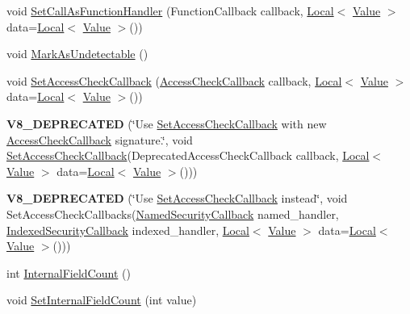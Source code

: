 \begin{DoxyCompactItemize}
\item 
void \hyperlink{classv8_1_1ObjectTemplate_a1775c8f73e643c339804d2f5b628eddf}{Set\+Call\+As\+Function\+Handler} (Function\+Callback callback, \hyperlink{classv8_1_1Local}{Local}$<$ \hyperlink{classv8_1_1Value}{Value} $>$ data=\hyperlink{classv8_1_1Local}{Local}$<$ \hyperlink{classv8_1_1Value}{Value} $>$())
\item 
void \hyperlink{classv8_1_1ObjectTemplate_a7e40ef313b44c2ad336c73051523b4f8}{Mark\+As\+Undetectable} ()
\item 
void \hyperlink{classv8_1_1ObjectTemplate_a5b0337016cd89fc72f3a9d75399c2487}{Set\+Access\+Check\+Callback} (\hyperlink{namespacev8_a1024fb358d107c1494163217830688e6}{Access\+Check\+Callback} callback, \hyperlink{classv8_1_1Local}{Local}$<$ \hyperlink{classv8_1_1Value}{Value} $>$ data=\hyperlink{classv8_1_1Local}{Local}$<$ \hyperlink{classv8_1_1Value}{Value} $>$())
\item 
{\bfseries V8\+\_\+\+D\+E\+P\+R\+E\+C\+A\+T\+ED} (\char`\"{}Use \hyperlink{classv8_1_1ObjectTemplate_a5b0337016cd89fc72f3a9d75399c2487}{Set\+Access\+Check\+Callback} with new \hyperlink{namespacev8_a1024fb358d107c1494163217830688e6}{Access\+Check\+Callback} signature.\char`\"{}, void \hyperlink{classv8_1_1ObjectTemplate_a5b0337016cd89fc72f3a9d75399c2487}{Set\+Access\+Check\+Callback}(Deprecated\+Access\+Check\+Callback callback,                                                                                                                               \hyperlink{classv8_1_1Local}{Local}$<$ \hyperlink{classv8_1_1Value}{Value} $>$ data=\hyperlink{classv8_1_1Local}{Local}$<$ \hyperlink{classv8_1_1Value}{Value} $>$()))\hypertarget{classv8_1_1ObjectTemplate_a816e285cb9f2a23b15bf7a718bc6a7fa}{}\label{classv8_1_1ObjectTemplate_a816e285cb9f2a23b15bf7a718bc6a7fa}

\item 
{\bfseries V8\+\_\+\+D\+E\+P\+R\+E\+C\+A\+T\+ED} (\char`\"{}Use \hyperlink{classv8_1_1ObjectTemplate_a5b0337016cd89fc72f3a9d75399c2487}{Set\+Access\+Check\+Callback} instead\char`\"{}, void Set\+Access\+Check\+Callbacks(\hyperlink{namespacev8_ab5cafda0c556bba990c660ce9c904e0d}{Named\+Security\+Callback} named\+\_\+handler,                                                                                                                                   \hyperlink{namespacev8_aebbcc7837753e51112d944ad96520da1}{Indexed\+Security\+Callback} indexed\+\_\+handler,                                                                                                                                   \hyperlink{classv8_1_1Local}{Local}$<$ \hyperlink{classv8_1_1Value}{Value} $>$ data=\hyperlink{classv8_1_1Local}{Local}$<$ \hyperlink{classv8_1_1Value}{Value} $>$()))\hypertarget{classv8_1_1ObjectTemplate_a1b3293962bb1685f127a58ab3ef3d29d}{}\label{classv8_1_1ObjectTemplate_a1b3293962bb1685f127a58ab3ef3d29d}

\item 
int \hyperlink{classv8_1_1ObjectTemplate_a43de785d594d8c01b18230b1aa79e31c}{Internal\+Field\+Count} ()
\item 
void \hyperlink{classv8_1_1ObjectTemplate_ab63916ac584a76bca8ba541f86ce9fce}{Set\+Internal\+Field\+Count} (int value)
\end{DoxyCompactItemize}
